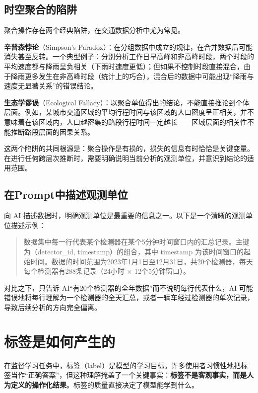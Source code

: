 \subsection{时空聚合的陷阱}

聚合操作存在两个经典陷阱，在交通数据分析中尤为常见。

\textbf{辛普森悖论}（Simpson's Paradox）：在分组数据中成立的规律，在合并数据后可能消失甚至反转。一个典型例子：分别分析工作日早高峰和非高峰时段，两个时段的平均速度都与降雨呈负相关（下雨时速度更低）；但如果不控制时段直接混合，由于降雨更多发生在非高峰时段（统计上的巧合），混合后的数据中可能出现“降雨与速度无显著关系”的错误结论。

\textbf{生态学谬误}（Ecological Fallacy）：以聚合单位得出的结论，不能直接推论到个体层面。例如，某城市交通区域的平均行程时间与该区域的人口密度呈正相关，并不意味着在该区域内，人口越密集的路段行程时间一定越长——区域层面的相关性不能推断路段层面的因果关系。

这两个陷阱的共同根源是：聚合操作是有损的，损失的信息有时恰恰是关键变量。在进行任何跨层次推断时，需要明确说明当前分析的观测单位，并意识到结论的适用范围。

\subsection{在Prompt中描述观测单位}

向 AI 描述数据时，明确观测单位是最重要的信息之一。以下是一个清晰的观测单位描述示例：

\begin{quote}
数据集中每一行代表某个检测器在某个5分钟时间窗口内的汇总记录。主键为（detector\_id, timestamp）的组合，其中 timestamp 为该时间窗口的起始时间。数据的时间范围为2023年1月1日至12月31日，共20个检测器，每天每个检测器有288条记录（24小时 × 12个5分钟窗口）。
\end{quote}

对比之下，只告诉 AI“有20个检测器的全年数据”而不说明每行代表什么，AI 可能错误地将每行理解为一个检测器的全天汇总，或者一辆车经过检测器的单次记录，导致后续分析的方向完全偏离。

\section{标签是如何产生的}
\label{sec:label}

在监督学习任务中，标签（label）是模型的学习目标。许多使用者习惯性地把标签当作“正确答案”，但这种理解掩盖了一个关键事实：\textbf{标签不是客观事实，而是人为定义的操作化结果}。标签的质量直接决定了模型能学到什么。

